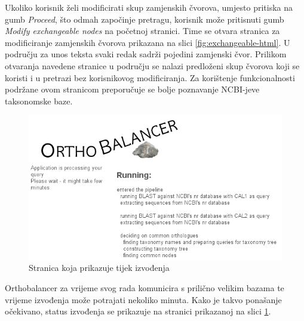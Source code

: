 Ukoliko korisnik želi modificirati skup zamjenskih čvorova, umjesto pritiska na
gumb \emph{Proceed}, što odmah započinje pretragu, korisnik može pritisnuti gumb
\emph{Modify exchangeable nodes} na početnoj stranici. Time se otvara stranica
za modificiranje zamjenskih čvorova prikazana na slici
\ref{fig:exchangeable-html}. U području za unos teksta svaki redak sadrži
pojedini zamjenski čvor. Prilikom otvaranja navedene stranice u području se
nalazi predloženi skup čvorova koji se koristi i u pretrazi bez korisnikovog
modificiranja. Za korištenje funkcionalnosti podržane ovom stranicom preporučuje
se bolje poznavanje NCBI-jeve taksonomske baze.

\begin{figure}[h!]
\centering
\includegraphics[width=5.0in]{figures/executing-html.png}
\caption{Stranica koja prikazuje tijek izvođenja}
\label{fig:executing-html}
\end{figure} 

Orthobalancer za vrijeme svog rada komunicira s prilično velikim bazama te
vrijeme izvođenja može potrajati nekoliko minuta. Kako je takvo ponašanje
očekivano, status izvođenja se prikazuje na stranici prikazanoj na slici
\ref{fig:executing-html}.
 

